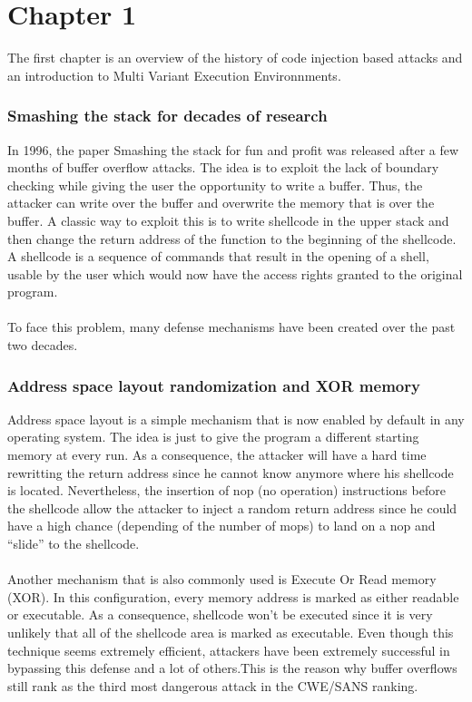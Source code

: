 \documentclass[english]{enstaPRE}
\begin{document}
\part{Chapter 1}
The first chapter is an overview of the history of code injection based attacks and an introduction to Multi Variant Execution Environnments.

\section{Smashing the stack for decades of research}
In 1996, the paper Smashing the stack for fun and profit was released after a few months of buffer overflow attacks.
The idea is to exploit the lack of boundary checking while giving the user the opportunity to write a buffer.
Thus, the attacker can write over the buffer and overwrite the memory that is over the buffer. 
A classic way to exploit this is to write shellcode in the upper stack and then change the return address of the function
to the beginning of the shellcode. A shellcode is a sequence of commands that result in the opening of a shell, usable by the user which
would now have the access rights granted to the original program.\\
 \\

To face this problem, many defense mechanisms have been created over the past two decades.

\section{Address space layout randomization and XOR memory}
Address space layout is a simple mechanism that is now enabled by default in any operating system. The idea is just to give the 
program a different starting memory at every run. As a consequence, the attacker will have a hard time rewritting the return address since
he cannot know anymore where his shellcode is located. 
Nevertheless, the insertion of nop (no operation) instructions before the shellcode allow the attacker to inject a random 
return address since he could have a high chance (depending of the number of mops) to land on a nop and ``slide'' to the shellcode.
\\ \\
Another mechanism that is also commonly used is Execute Or Read memory (XOR). In this configuration, every memory address is marked
as either readable or executable. As a consequence, shellcode won't be executed since it is very unlikely that all of the shellcode
area is marked as executable.
Even though this technique seems extremely efficient, attackers have been extremely successful in bypassing this defense 
and a lot of others.This is the reason why buffer overflows still rank as the third most dangerous attack in the CWE/SANS ranking.\\
 \\
\end{document}
